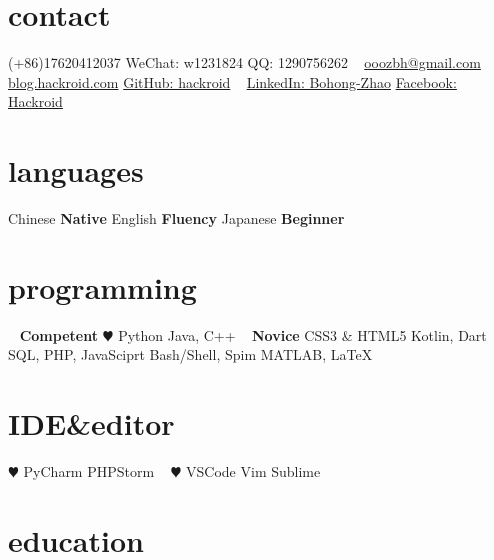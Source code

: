 \documentclass[hidelinks__VERSION__]{adamyi-cv}
\begin{document}



\begin{aside} %
\section{contact}
(+86)17620412037
WeChat: w1231824
QQ: 1290756262
~
\href{mailto:ooozbh@gmail.com}{ooozbh@gmail.com}
\href{https://blog.hackroid.com}{blog.hackroid.com}
\href{https://github.com/hackroid}{GitHub: hackroid}
~
\href{https://www.linkedin.com/in/%E5%8D%9A%E5%BC%98-%E8%B5%B5-b7ab09136/}{LinkedIn: Bohong-Zhao}
\href{https://www.facebook.com/Hackro1d}{Facebook: Hackroid}
\section{languages}
Chinese \textbf{Native}
English \textbf{Fluency}
Japanese \textbf{Beginner}
\section{programming}
~
\textbf{Competent}
{\color{red} $\varheart$} Python
Java, C++
~
\textbf{Novice}
CSS3 \& HTML5
Kotlin, Dart
SQL, PHP, JavaSciprt
Bash/Shell, Spim
MATLAB, \LaTeX
\section{IDE\&editor}
{\color{red} $\varheart$} PyCharm
PHPStorm
~
{\color{red} $\varheart$} VSCode
Vim
Sublime
\versionsection
\end{aside}


\section{education}
\end{document}
